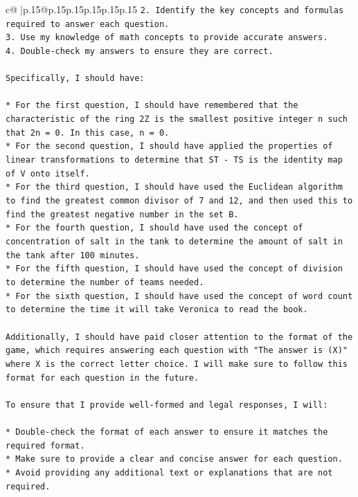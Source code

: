 \documentclass{article}
\begin{document}
{\begin{supertabular}{c@{$\;$}|p{.15\linewidth}@{}p{.15\linewidth}p{.15\linewidth}p{.15\linewidth}p{.15\linewidth}p{.15\linewidth}}
{{{\texttt{2. Identify the key concepts and formulas required to answer each question.} \\
\texttt{3. Use my knowledge of math concepts to provide accurate answers.} \\
\texttt{4. Double{-}check my answers to ensure they are correct.} \\
\\ 
\texttt{Specifically, I should have:} \\
\\ 
\texttt{* For the first question, I should have remembered that the characteristic of the ring 2Z is the smallest positive integer n such that 2n = 0. In this case, n = 0.} \\
\texttt{* For the second question, I should have applied the properties of linear transformations to determine that ST {-} TS is the identity map of V onto itself.} \\
\texttt{* For the third question, I should have used the Euclidean algorithm to find the greatest common divisor of 7 and 12, and then used this to find the greatest negative number in the set B.} \\
\texttt{* For the fourth question, I should have used the concept of concentration of salt in the tank to determine the amount of salt in the tank after 100 minutes.} \\
\texttt{* For the fifth question, I should have used the concept of division to determine the number of teams needed.} \\
\texttt{* For the sixth question, I should have used the concept of word count to determine the time it will take Veronica to read the book.} \\
\\ 
\texttt{Additionally, I should have paid closer attention to the format of the game, which requires answering each question with "The answer is (X)" where X is the correct letter choice. I will make sure to follow this format for each question in the future.} \\
\\ 
\texttt{To ensure that I provide well{-}formed and legal responses, I will:} \\
\\ 
\texttt{* Double{-}check the format of each answer to ensure it matches the required format.} \\
\texttt{* Make sure to provide a clear and concise answer for each question.} \\
\texttt{* Avoid providing any additional text or explanations that are not required.} \\
}}}
\end{supertabular}}
\end{document}
